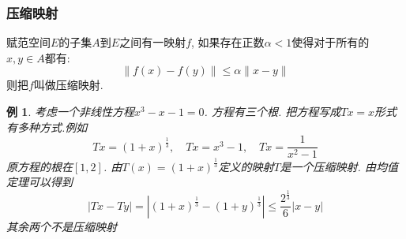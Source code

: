 \documentclass[a4paper,11pt]{article}
\theoremstyle{mystyle}
\newtheorem{example}{\hspace{2em}例}[section]
\begin{document}
\subsubsection*{压缩映射}
\begin{definition}
  赋范空间$E$的子集$A$到$E$之间有一映射$f$, 如果存在正数$\alpha<1$使得对于所有的$x,y\in A$都有:
  \begin{equation*}
    \|f(x)-f(y)\|\leq\alpha\|x-y\|
  \end{equation*}
  则把$f$叫做压缩映射.
\end{definition}
\begin{example}
  考虑一个非线性方程$x^3-x-1=0$. 方程有三个根. 把方程写成$Tx=x$形式有多种方式.例如
  \begin{equation*}
    Tx=(1+x)^{\frac{1}{3}},\quad Tx=x^3-1,\quad Tx=\frac{1}{x^2-1}
  \end{equation*}
  原方程的根在$[1,2]$. 由$T(x)=(1+x)^{\frac{1}{3}}$定义的映射$T$是一个压缩映射. 由均值定理可以得到
  \begin{equation*}
    |Tx-Ty|=|(1+x)^{\frac{1}{3}}-(1+y)^{\frac{1}{3}}|\leq\frac{2^{\frac{1}{3}}}{6}|x-y|
  \end{equation*}
  其余两个不是压缩映射
\end{example}
\end{document}
